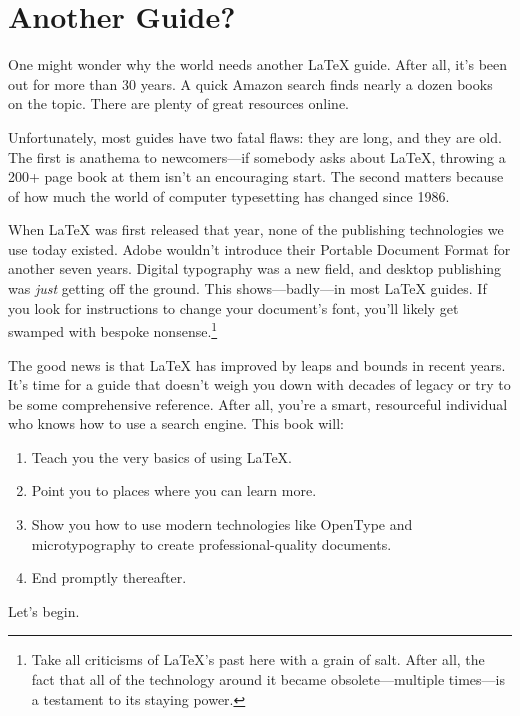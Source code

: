 \section{Another Guide?}

One might wonder why the world needs another \LaTeX{} guide.
After all, it's been out for more than 30 years.
A quick Amazon search finds nearly a dozen books on the topic.
There are plenty of great resources online.

Unfortunately, most guides have two fatal flaws: they are long,
and they are old.
The first is anathema to newcomers---if somebody asks about \LaTeX{},
throwing a 200+ page book at them isn't an encouraging start.
The second matters because of how much the world of computer typesetting has
changed since 1986.

When \LaTeX{} was first released that year, none of the publishing technologies
we use today existed.
Adobe wouldn't introduce their Portable Document Format for another seven years.
Digital typography was a new field, and desktop publishing was \emph{just}
getting off the ground.\punckern{}
This shows---badly---in most \LaTeX{} guides.
If you look for instructions to change your document's font,
you'll likely get swamped with bespoke nonsense.\punckern\footnote{%
Take all criticisms of \LaTeX's past here with a grain of
salt. After all, the fact that all of the technology around it became
obsolete---multiple times---is a testament to its staying power.}

The good news is that  \LaTeX{} has improved by leaps and bounds in recent years.
It's time for a guide that doesn't weigh you down with decades of legacy
or try to be some comprehensive reference.
After all, you're a smart, resourceful individual who knows how to use a search
engine.
This book will:
\begin{enumerate}
\item Teach you the very basics of using \LaTeX.
\item Point you to places where you can learn more.
\item Show you how to use modern technologies like OpenType and microtypography
    to create professional-quality documents.
\item End promptly thereafter.
\end{enumerate}
Let's begin.
